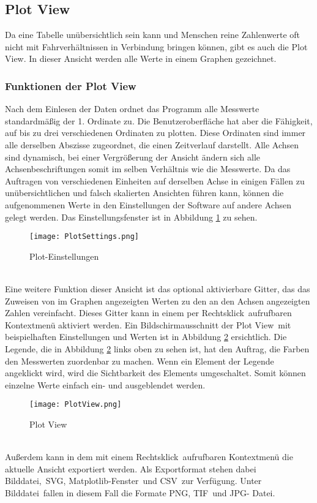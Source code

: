 \subsection{Plot View}
\label{subsec:VisPlotView}
Da eine Tabelle unübersichtlich sein kann und Menschen reine Zahlenwerte oft nicht mit Fahrverhältnissen in Verbindung bringen können, gibt es auch die \glqq Plot View\grqq . In dieser Ansicht werden alle Werte in einem Graphen gezeichnet.
\subsubsection{Funktionen der Plot View}
\label{subsubsec:PlotViewFunktion}
Nach dem Einlesen der Daten ordnet das Programm alle Messwerte standardmäßig der 1. Ordinate zu. Die Benutzeroberfläche hat aber die Fähigkeit, auf bis zu drei verschiedenen Ordinaten zu plotten. Diese Ordinaten sind immer alle derselben Abszisse zugeordnet, die einen Zeitverlauf darstellt. Alle Achsen sind dynamisch, bei einer Vergrößerung der Ansicht ändern sich alle Achsenbeschriftungen somit im selben Verhältnis wie die Messwerte. Da das Auftragen von verschiedenen Einheiten auf derselben Achse in einigen Fällen zu unübersichtlichen und falsch skalierten Ansichten führen kann, können die aufgenommenen Werte in den Einstellungen der Software auf andere Achsen gelegt werden. Das Einstellungsfenster ist in Abbildung \ref{fig:plotsettings} zu sehen.
\begin{figure}[h]
\centering
\texttt{[image: PlotSettings.png]}
\caption{Plot-Einstellungen}
\label{fig:plotsettings}
\end{figure}
\\
Eine weitere Funktion dieser Ansicht ist das optional aktivierbare Gitter, das das Zuweisen von im Graphen angezeigten Werten zu den an den Achsen angezeigten Zahlen vereinfacht. Dieses Gitter kann in einem per \glqq Rechtsklick\grqq \ aufrufbaren Kontextmenü aktiviert werden. Ein Bildschirmausschnitt der \glqq Plot View\grqq \ mit beispielhaften Einstellungen und Werten ist in Abbildung \ref{fig:PlotView} ersichtlich. Die Legende, die in Abbildung \ref{fig:PlotView} links oben zu sehen ist, hat den Auftrag, die Farben den Messwerten zuordenbar zu machen. Wenn ein Element der Legende angeklickt wird, wird die Sichtbarkeit des Elements umgeschaltet. Somit können einzelne Werte einfach ein- und ausgeblendet werden.
\begin{figure}[h]
\centering
\texttt{[image: PlotView.png]}
\caption{Plot View}
\label{fig:PlotView}
\end{figure}
\\
Außerdem kann in dem mit einem \glqq Rechtsklick\grqq \ aufrufbaren Kontextmenü die aktuelle Ansicht exportiert werden. Als Exportformat stehen dabei \glqq Bilddatei\grqq ,\ \glqq \ac{SVG}\grqq , \glqq Matplotlib-Fenster\grqq\ und \glqq \ac{CSV}\grqq\ zur Verfügung. Unter \glqq Bilddatei\grqq\ fallen in diesem Fall die Formate \glqq\ac{PNG}\grqq , \glqq\ac{TIF}\grqq\ und \glqq\ac{JPG}- Datei\grqq .
